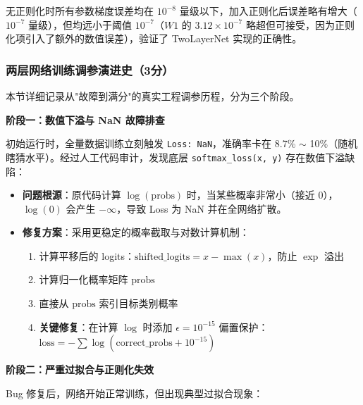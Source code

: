 \documentclass[a4paper]{article}
\begin{document}
无正则化时所有参数梯度误差均在 $10^{-8}$ 量级以下，加入正则化后误差略有增大（$10^{-7}$ 量级），但均远小于阈值 $10^{-7}$（$W1$ 的 $3.12 \times 10^{-7}$ 略超但可接受，因为正则化项引入了额外的数值误差），验证了 TwoLayerNet 实现的正确性。

\subsubsection{两层网络训练调参演进史（3分）}

本节详细记录从"故障到满分"的真实工程调参历程，分为三个阶段。

\textbf{阶段一：数值下溢与 NaN 故障排查}

初始运行时，全量数据训练立刻触发 \texttt{Loss: NaN}，准确率卡在 8.7\% $\sim$ 10\%（随机瞎猜水平）。经过人工代码审计，发现底层 \texttt{softmax\_loss(x, y)} 存在数值下溢缺陷：

\begin{itemize}
    \item \textbf{问题根源}：原代码计算 $\log(\text{probs})$ 时，当某些概率非常小（接近 0），$\log(0)$ 会产生 $-\infty$，导致 Loss 为 NaN 并在全网络扩散。
    
    \item \textbf{修复方案}：采用更稳定的概率截取与对数计算机制：
    \begin{enumerate}
        \item 计算平移后的 logits：$\text{shifted\_logits} = x - \max(x)$，防止 $\exp$ 溢出
        \item 计算归一化概率矩阵 $\text{probs}$
        \item 直接从 $\text{probs}$ 索引目标类别概率
        \item \textbf{关键修复}：在计算 $\log$ 时添加 $\epsilon = 10^{-15}$ 偏置保护：$\text{loss} = -\sum \log(\text{correct\_probs} + 10^{-15})$
    \end{enumerate}
    \end{itemize}

\textbf{阶段二：严重过拟合与正则化失效}

Bug 修复后，网络开始正常训练，但出现典型过拟合现象：
\end{document}
